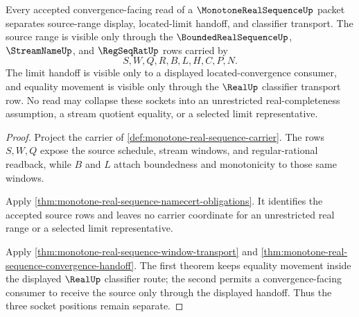 \begin{theorem}
\label{thm:monotone-real-sequence-socket-taxonomy}
Every accepted convergence-facing read of a $\MonotoneRealSequenceUp$ packet separates source-range display, located-limit handoff, and classifier transport. The source range is visible only through the $\BoundedRealSequenceUp$, $\StreamNameUp$, and $\RegSeqRatUp$ rows carried by
$$
S,W,Q,R,B,L,H,C,P,N .
$$
The limit handoff is visible only to a displayed located-convergence consumer, and equality movement is visible only through the $\RealUp$ classifier transport row. No read may collapse these sockets into an unrestricted real-completeness assumption, a stream quotient equality, or a selected limit representative.
\end{theorem}
\begin{proof}
Project the carrier of \autoref{def:monotone-real-sequence-carrier}. The rows $S,W,Q$ expose the source schedule, stream windows, and regular-rational readback, while $B$ and $L$ attach boundedness and monotonicity to those same windows.

Apply \autoref{thm:monotone-real-sequence-namecert-obligations}. It identifies the accepted source rows and leaves no carrier coordinate for an unrestricted real range or a selected limit representative.

Apply \autoref{thm:monotone-real-sequence-window-transport} and \autoref{thm:monotone-real-sequence-convergence-handoff}. The first theorem keeps equality movement inside the displayed $\RealUp$ classifier route; the second permits a convergence-facing consumer to receive the source only through the displayed handoff. Thus the three socket positions remain separate.
\end{proof}




